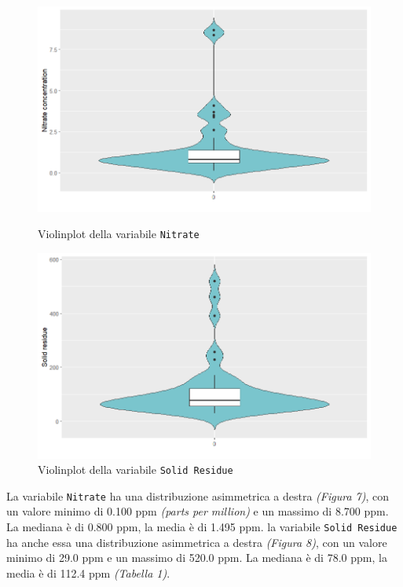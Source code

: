 \documentclass{article} %
\begin{document}
\begin{figure}[H]
    \centering
    \begin{minipage}{0.49\textwidth}
        \centering
        \includegraphics[width=\textwidth]{immagini/vp_nitrate.png}
        \captionsetup{justification=centering}
        \caption{Violinplot della variabile \texttt{Nitrate}}
    \end{minipage}
    \hfill
    \begin{minipage}{0.49\textwidth}
        \centering
        \includegraphics[width=\textwidth]{immagini/vp_sd.png}
        \captionsetup{justification=centering}
        \caption{Violinplot della variabile \texttt{Solid Residue}}
    \end{minipage}
\end{figure}
La variabile \texttt{Nitrate} ha una distribuzione asimmetrica a destra \textit{(Figura 7)}, con un valore minimo di 0.100 ppm \textit{(parts per million)} e un massimo di 8.700 ppm. La mediana è di 0.800 ppm, la media è di 1.495 ppm.
la variabile \texttt{Solid Residue} ha anche essa una distribuzione asimmetrica a destra \textit{(Figura 8)}, con un valore minimo di 29.0 ppm e un massimo di 520.0 ppm. La mediana è di 78.0 ppm, la media è di 112.4 ppm \textit{(Tabella 1)}.
\end{document}
